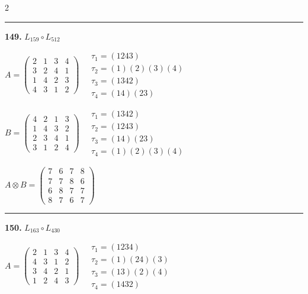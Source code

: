 \begin{multicols}{2}
\vspace{0.3em}
\hrule
\vspace{0.3em}

\noindent\textbf{149.} $L_{159} \circ L_{512}$

$A = \begin{pmatrix} 2 & 1 & 3 & 4 \\ 3 & 2 & 4 & 1 \\ 1 & 4 & 2 & 3 \\ 4 & 3 & 1 & 2 \end{pmatrix} \quad \begin{matrix} \tau_{1}=(1 2 4 3) \\ \tau_{2}=(1)(2)(3)(4) \\ \tau_{3}=(1 3 4 2) \\ \tau_{4}=(1 4)(2 3) \end{matrix}$

$B = \begin{pmatrix} 4 & 2 & 1 & 3 \\ 1 & 4 & 3 & 2 \\ 2 & 3 & 4 & 1 \\ 3 & 1 & 2 & 4 \end{pmatrix} \quad \begin{matrix} \tau_{1}=(1 3 4 2) \\ \tau_{2}=(1 2 4 3) \\ \tau_{3}=(1 4)(2 3) \\ \tau_{4}=(1)(2)(3)(4) \end{matrix}$

$A \otimes B = \begin{pmatrix} 7 & 6 & 7 & 8 \\ 7 & 7 & 8 & 6 \\ 6 & 8 & 7 & 7 \\ 8 & 7 & 6 & 7 \end{pmatrix}$

\vspace{0.3em}
\hrule
\vspace{0.3em}

\noindent\textbf{150.} $L_{163} \circ L_{430}$

$A = \begin{pmatrix} 2 & 1 & 3 & 4 \\ 4 & 3 & 1 & 2 \\ 3 & 4 & 2 & 1 \\ 1 & 2 & 4 & 3 \end{pmatrix} \quad \begin{matrix} \tau_{1}=(1 2 3 4) \\ \tau_{2}=(1)(2 4)(3) \\ \tau_{3}=(1 3)(2)(4) \\ \tau_{4}=(1 4 3 2) \end{matrix}$


\end{multicols}
